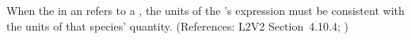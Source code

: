 When the  in an \InitialAssignment refers to a \Species,
the units of the \InitialAssignment's  expression must be
consistent with the units of that species' quantity.  (References:
L2V2 Section~4.10.4; )
